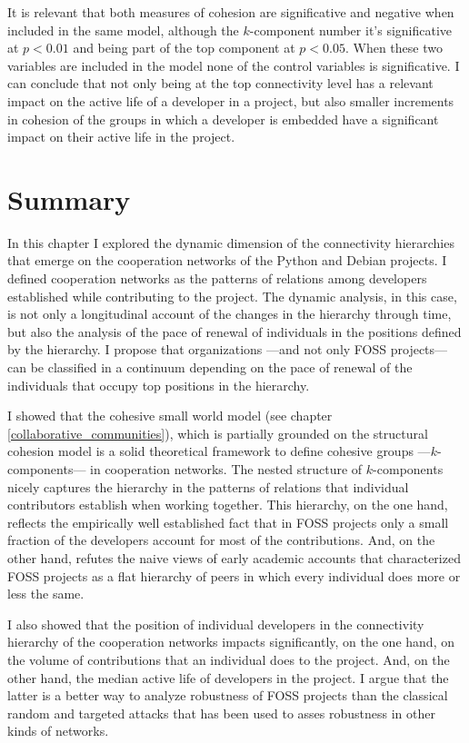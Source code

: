 It is relevant that both measures of cohesion are significative and negative when included in the same model, although the $k$-component number it's significative at $p < 0.01$ and being part of the top component at $p < 0.05$. When these two variables are included in the model none of the control variables is significative. I can conclude that not only being at the top connectivity level has a relevant impact on the active life of a developer in a project, but also smaller increments in cohesion of the groups in which a developer is embedded have a significant impact on their active life in the project.

\section{Summary}

In this chapter I explored the dynamic dimension of the connectivity hierarchies that emerge on the cooperation networks of the Python and Debian projects. I defined cooperation networks as the patterns of relations among developers established while contributing to the project. The dynamic analysis, in this case, is not only a longitudinal account of the changes in the hierarchy through time, but also the analysis of the pace of renewal of individuals in the positions defined by the hierarchy. I propose that organizations ---and not only FOSS projects--- can be classified in a continuum depending on the pace of renewal of the individuals that occupy top positions in the hierarchy.

I showed that the cohesive small world model (see chapter \ref{collaborative_communities}), which is partially grounded on the structural cohesion model \citep{white:2001, moody:2003} is a solid theoretical framework to define cohesive groups ---$k$-components--- in cooperation networks. The nested structure of $k$-components nicely captures the hierarchy in the patterns of relations that individual contributors establish when working together. This hierarchy, on the one hand, reflects the empirically well established fact that in FOSS projects only a small fraction of the developers account for most of the contributions. And, on the other hand, refutes the naive views of early academic accounts that characterized FOSS projects as a flat hierarchy of peers in which every individual does more or less the same.

I also showed that the position of individual developers in the connectivity hierarchy of the cooperation networks impacts significantly, on the one hand, on the volume of contributions that an individual does to the project. And, on the other hand, the median active life of developers in the project. I argue that the latter is a better way to analyze robustness of FOSS projects than the classical random and targeted attacks that has been used to asses robustness in other kinds of networks.

